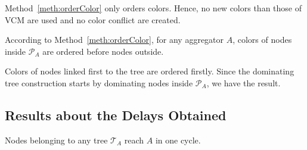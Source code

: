 \begin{comment}
\subsection{Method of Associating Slots to Colors}
\begin{method}[Associating slots to colors]\label{meth:orderSlot}
Slots are associated to colors according to their decreasing order: earliest slots are occupied by highest colors.
\end{method}
\end{comment}

\begin{remark}
Method~\ref{meth:orderColor} only orders colors. Hence,  no new colors than those of VCM are used and no color conflict are created.
\end{remark}


















\begin{comment}
\begin{lemma}
For any two trees $\mathcal{T}_{Ag_1}$ and $\mathcal{T}_{Ag_2}$ rooted respectively at aggregators $Ag_1$ and $Ag_2$, the maximum number of colors used by this trees inside $\mathcal{P}_{Ag_1}$ and $\mathcal{P}_{Ag_2}$ respectively is the same.
\end{lemma}

\proof
The algorithm of dominating tree construction is the same for any aggregator.
Also, the features this algorithm uses are only relative to the symmetry of the grid. \tred{Consequently, the obtained trees are similar.}
Hence the lemma.
\endproof
\end{comment}

\begin{lemma}\label{lemma:insideFirst}
According to Method~\ref{meth:orderColor}, for any aggregator $A$, colors of nodes inside $\mathcal{P}_A$ are ordered before nodes outside.
\end{lemma}
\proof
Colors of nodes linked first to the tree are ordered firstly. Since the dominating tree construction starts by dominating nodes inside $\mathcal{P}_A$, we have the result.
\endproof
\subsection{Results about the Delays Obtained}
\begin{theorem}\label{theo:treeNode}
Nodes belonging to any tree $\mathcal{T}_{A}$ reach $A$ in one cycle.
\end{theorem}

